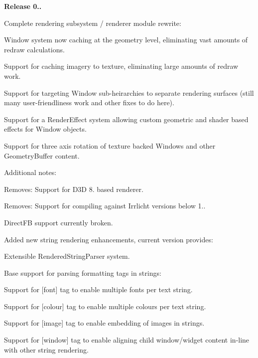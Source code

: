 {\bfseries{Release 0..}}
\begin{DoxyItemize}
\item Complete rendering subsystem / renderer module rewrite\+:
\begin{DoxyItemize}
\item Window system now caching at the geometry level, eliminating vast amounts of redraw calculations.
\item Support for caching imagery to texture, eliminating large amounts of redraw work.
\item Support for targeting Window sub-\/heirarchies to separate rendering surfaces (still many user-\/friendliness work and other fixes to do here).
\item Support for a Render\+Effect system allowing custom geometric and shader based effects for Window objects.
\item Support for three axis rotation of texture backed Windows and other Geometry\+Buffer content.
\item Additional notes\+:
\begin{DoxyItemize}
\item Removes\+: Support for D3D 8. based renderer.
\item Removes\+: Support for compiling against Irrlicht versions below 1..
\item Direct\+FB support currently broken.
\end{DoxyItemize}
\end{DoxyItemize}
\item Added new string rendering enhancements, current version provides\+:
\begin{DoxyItemize}
\item Extensible Rendered\+String\+Parser system.
\item Base support for parsing formatting tags in strings\+:
\begin{DoxyItemize}
\item Support for \mbox{[}font\mbox{]} tag to enable multiple fonts per text string.
\item Support for \mbox{[}colour\mbox{]} tag to enable multiple colours per text string.
\item Support for \mbox{[}image\mbox{]} tag to enable embedding of images in strings.
\item Support for \mbox{[}window\mbox{]} tag to enable aligning child window/widget content in-\/line with other string rendering.
\end{DoxyItemize}
\end{DoxyItemize}

\end{DoxyItemize}
